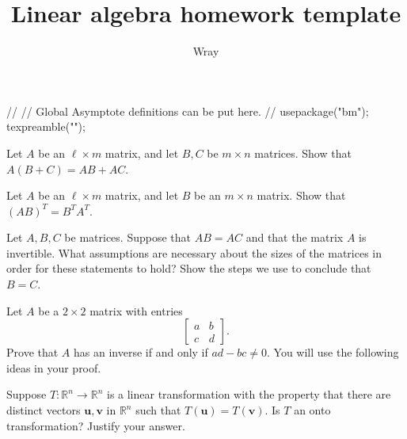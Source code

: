 \documentclass[addpoints, 12pt]{exam}
\title{Linear algebra homework template}
\author{Wray}
\renewcommand{\vec}[1]{\mathbf{#1}}
\newcommand{\real}{\mathbb{R}}
\begin{document}
\begin{asydef}
//
// Global Asymptote definitions can be put here.
//
usepackage("bm");
texpreamble("\def\V#1{\bm{#1}}");
\end{asydef}



\bigskip
\bigskip
\smallskip

\begin{questions}

\question
Let $A$ be an $\ell \times m$ matrix, and let $B,C$ be $m \times n$ matrices.  Show that $A(B+C) = AB + AC$.

\question
Let $A$ be an $\ell \times m$ matrix, and let $B$ be an $m \times n$ matrix.  Show that $(AB)^T = B^T A^T$.

\question
Let $A,B,C$ be matrices.  Suppose that $AB = AC$ and that the matrix $A$ is invertible.  What assumptions are necessary about the sizes of the matrices in order for these statements to hold?  Show the steps we use to conclude that $B = C$.

\question
Let $A$ be a $2 \times 2$ matrix with entries
\begin{equation*}
\left[ \begin{array}{cc}
a & b \\
c & d
\end{array}
\right].
\end{equation*}
Prove that $A$ has an inverse if and only if $ad - bc \ne 0$.  You will use the following ideas in your proof.

\question
Suppose $T: \real^n \to \real^n$ is a linear transformation with the property that there are distinct vectors $\vec{u}, \vec{v}$ in $\real^n$ such that $T(\vec{u}) = T(\vec{v})$.  Is $T$ an onto transformation?  Justify your answer.

\end{questions}
\end{document}
